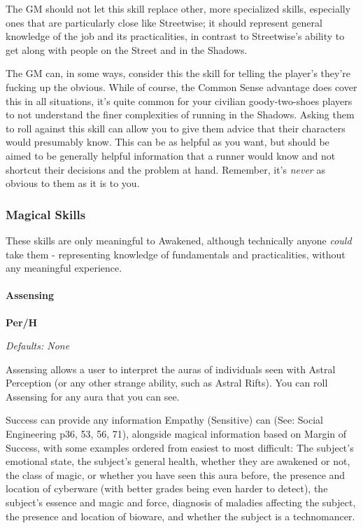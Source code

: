\begin{multicols}{3}
	The GM should not let this skill replace other, more specialized skills, especially ones that are particularly close like Streetwise; it should represent general knowledge of the job and its practicalities, in contrast to Streetwise's ability to get along with people on the Street and in the Shadows.
	
	The GM can, in some ways, consider this the skill for telling the player's they're fucking up the obvious. While of course, the Common Sense advantage does cover this in all situations, it's quite common for your civilian goody-two-shoes players to not understand the finer complexities of running in the Shadows. Asking them to roll against this skill can allow you to give them advice that their characters would presumably know. This can be as helpful as you want, but should be aimed to be generally helpful information that a runner would know and not shortcut their decisions and the problem at hand. Remember, it's \textit{never} as obvious to them as it is to you.
	
	\subsubsection*{Magical Skills}
	
	These skills are only meaningful to Awakened, although technically anyone \textit{could} take them - representing knowledge of fundamentals and practicalities, without any meaningful experience.
	
	\paragraph{Assensing}\label{assensing_skill}
	\begin{flushright}
		\textbf{Per/H}
	\end{flushright}
	\textcolor{NavyBlue}{\textit{Defaults: None}}
	
	Assensing allows a user to interpret the auras of individuals seen with Astral Perception (or any other strange ability, such as Astral Rifts). You can roll Assensing for any aura that you can see.
	
	Success can provide any information Empathy (Sensitive) can (See: Social Engineering p36, 53, 56, 71), alongside magical information based on Margin of Success, with some examples ordered from easiest to most difficult: The subject's emotional state, the subject's general health, whether they are awakened or not, the class of magic, or whether you have seen this aura before, the presence and location of cyberware (with better grades being even harder to detect), the subject's essence and magic and force, diagnosis of maladies affecting the subject, the presence and location of bioware, and whether the subject is a technomancer. 
	

\end{multicols}
